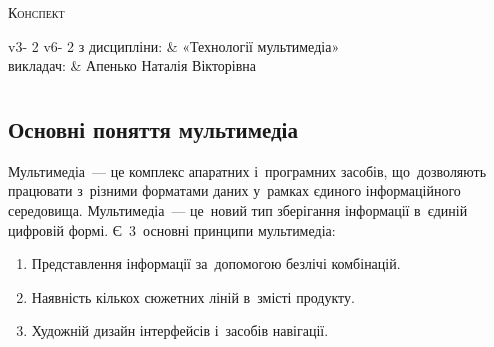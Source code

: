 \documentclass[
	a4paper,
	oneside,
	BCOR = 10mm,
	DIV = 12,
	12pt,
	headings = normal,
]{scrartcl}
\newlength{\gridunitwidth}
\newlength{\gridunitheight}
\begin{document}
	\begin{titlepage}
		\vspace*{4\gridunitheight}
			\noindent\textsc{Конспект}\\[\baselineskip]
			{\setlength{\tabcolsep}{0em}
			\begin{tabular}{
					v{3\gridunitwidth - 2\tabcolsep}
					v{6\gridunitwidth - 2\tabcolsep}
			}
				з дисципліни: & «Технології мультимедіа»\\
				викладач:     & Апенько Наталія Вікторівна\\
			\end{tabular}
			}
		\vspace*{\fill}
	\end{titlepage}

	\tableofcontents
	\newpage

	\section{}
		\subsection{Основні поняття мультимедіа}
			Мультимедіа~— це комплекс апаратних і~програмних засобів, що~дозволяють працювати з~різними форматами даних у~рамках єдиного інформаційного середовища. Мультимедіа~— це~новий тип зберігання інформації в~єдиній цифровій формі. Є~3~основні принципи мультимедіа:
			\begin{enumerate}[noitemsep]
				\item Представлення інформації за~допомогою безлічі комбінацій.
				\item Наявність кількох сюжетних ліній в~змісті продукту.
				\item Художній дизайн інтерфейсів і~засобів навігації.
			\end{enumerate}
\end{document}

